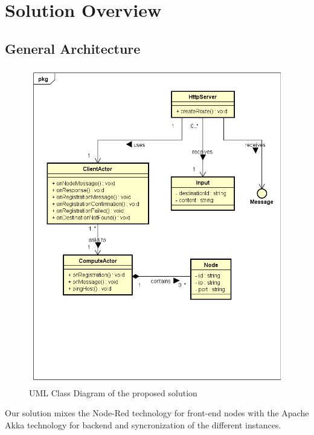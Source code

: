 \documentclass[table, 12pt]{article}
\begin{document}
\section{Solution Overview}
\subsection{General Architecture}
\begin{figure}
    \includegraphics[width=\textwidth]{assets/UML.png}
    \caption{UML Class Diagram of the proposed solution}
    \label{uml}
\end{figure}
Our solution mixes the Node-Red technology for front-end nodes with the Apache Akka technology for backend and syncronization of the different instances.
\end{document}
